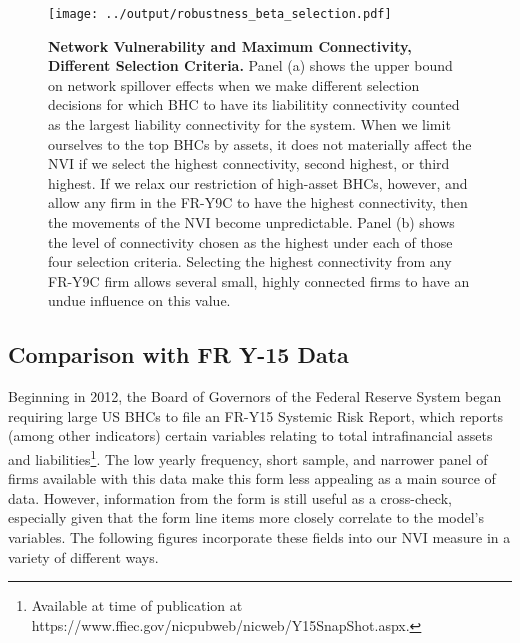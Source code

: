 \begin{figure}[h!]
\begin{center}
\texttt{[image: ../output/robustness\_beta\_selection.pdf]} 
\end{center}
\caption[]{\textbf{Network Vulnerability and Maximum Connectivity, Different Selection Criteria.} Panel (a) shows the upper bound on network spillover effects when we make different selection decisions for which BHC to have its liabilitity connectivity counted as the largest liability connectivity for the system. When we limit ourselves to the top BHCs by assets, it does not materially affect the NVI if we select the highest connectivity, second highest, or third highest. If we relax our restriction of high-asset BHCs, however, and allow any firm in the FR-Y9C to have the highest connectivity, then the movements of the NVI become unpredictable. Panel (b) shows the level of connectivity chosen as the highest under each of those four selection criteria. Selecting the highest connectivity from any FR-Y9C firm allows several small, highly connected firms to have an undue influence on this value.} \label{fig:NVI_robust_betanum}
\end{figure}

\subsection{Comparison with FR Y-15 Data}

Beginning in 2012, the Board of Governors of the Federal Reserve System began requiring large US BHCs to file an FR-Y15 Systemic Risk Report, which reports (among other indicators) certain variables relating to total intrafinancial assets and liabilities\footnote{Available at time of publication at https://www.ffiec.gov/nicpubweb/nicweb/Y15SnapShot.aspx.}. The low yearly frequency, short sample, and narrower panel of firms available with this data make this form less appealing as a main source of data. However, information from the form is still useful as a cross-check, especially given that the form line items more closely correlate to the model's variables. The following figures incorporate these fields into our NVI measure in a variety of different ways. 


